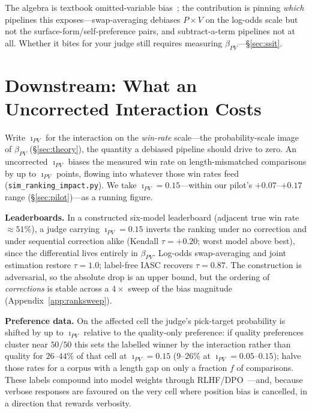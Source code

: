 \documentclass{article}
\begin{document}
\noindent The algebra is textbook omitted-variable
bias~\cite{angrist2009}; the contribution is pinning \emph{which}
pipelines this exposes---swap-averaging debiases $P{\times}V$ on the
log-odds scale but not the surface-form/self-preference pairs, and
subtract-a-term pipelines not at all. Whether it bites for your
judge still requires measuring $\beta_{PV}$---\S\ref{sec:ssit}.

\section{Downstream: What an Uncorrected Interaction Costs}
\label{sec:downstream}

Write $\imath_{PV}$ for the interaction on the \emph{win-rate}
scale---the probability-scale image of $\beta_{PV}$
(\S\ref{sec:theory}), the quantity a debiased pipeline should drive
to zero. An uncorrected $\imath_{PV}$ biases the measured win rate on
length-mismatched comparisons by up to $\imath_{PV}$ points, flowing
into whatever those win rates feed
(\texttt{sim\_ranking\_impact.py}). We take
$\imath_{PV}{=}0.15$---within our pilot's $+0.07$--$+0.17$ range
(\S\ref{sec:pilot})---as a running figure.

\textbf{Leaderboards.} In a constructed six-model leaderboard
(adjacent true win rate ${\approx}51\%$), a judge carrying
$\imath_{PV}{=}0.15$ inverts the ranking under no correction and
under sequential correction alike (Kendall $\tau{=}+0.20$; worst
model above best), since the differential lives entirely in
$\beta_{PV}$. Log-odds swap-averaging and joint estimation restore
$\tau{=}1.0$; label-free IASC recovers $\tau{=}0.87$. The
construction is adversarial, so the absolute drop is an upper
bound, but the ordering of \emph{corrections} is stable across a
$4\times$ sweep of the bias magnitude (Appendix~\ref{app:ranksweep}).

\textbf{Preference data.} On the affected cell the judge's
pick-target probability is shifted by up to $\imath_{PV}$ relative
to the quality-only preference: if quality preferences cluster near
$50/50$ this sets the labelled winner by the interaction rather than
quality for $26$--$44\%$ of that cell at $\imath_{PV}{=}0.15$
($9$--$26\%$ at $\imath_{PV}{=}0.05$--$0.15$); halve those rates for
a corpus with a length gap on only a fraction $f$ of comparisons.
These labels compound into model weights through
RLHF/DPO~\cite{sharma2023sycophancy}---and, because verbose
responses are favoured on the very cell where position bias is
cancelled, in a direction that rewards verbosity.
\end{document}
